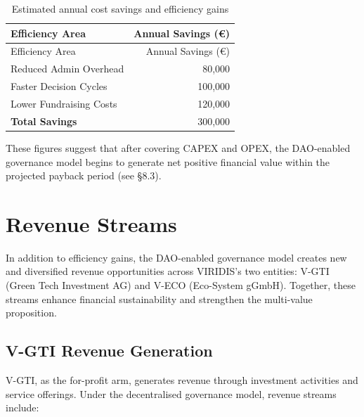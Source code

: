\documentclass[
  english,
  12pt,
  oneside,
  open=any]{scrbook}
\begin{document}
\begin{longtable}[]{@{}lr@{}}
\caption{Estimated annual cost savings and efficiency
gains}\label{tbl-savings}\tabularnewline
\toprule\noalign{}
Efficiency Area & Annual Savings (€) \\
\midrule\noalign{}
\endfirsthead
\toprule\noalign{}
Efficiency Area & Annual Savings (€) \\
\midrule\noalign{}
\endhead
\bottomrule\noalign{}
\endlastfoot
Reduced Admin Overhead & 80,000 \\
Faster Decision Cycles & 100,000 \\
Lower Fundraising Costs & 120,000 \\
\textbf{Total Savings} & 300,000 \\
\end{longtable}

These figures suggest that after covering CAPEX and OPEX, the
DAO-enabled governance model begins to generate net positive financial
value within the projected payback period (see §8.3).

\section{Revenue Streams}\label{sec-revenue}

In addition to efficiency gains, the DAO-enabled governance model
creates new and diversified revenue opportunities across VIRIDIS's two
entities: V-GTI (Green Tech Investment AG) and V-ECO (Eco-System gGmbH).
Together, these streams enhance financial sustainability and strengthen
the multi-value proposition.

\subsection{V-GTI Revenue Generation}\label{sec-vgti}

V-GTI, as the for-profit arm, generates revenue through investment
activities and service offerings. Under the decentralised governance
model, revenue streams include:
\end{document}
